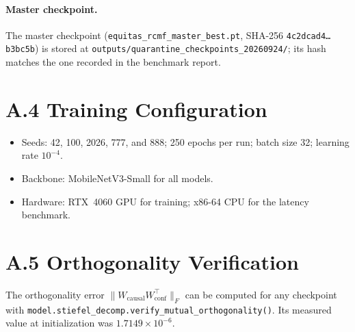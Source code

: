 \paragraph{Master checkpoint.} The master checkpoint (\texttt{equitas\_rcmf\_master\_best.pt}, SHA-256 \texttt{4c2dcad4\ldots b3bc5b}) is stored at \texttt{outputs/quarantine\_checkpoints\_20260924/}; its hash matches the one recorded in the benchmark report.

\section*{A.4 Training Configuration}
\begin{itemize}
    \item Seeds: 42, 100, 2026, 777, and 888; 250 epochs per run; batch size 32; learning rate $10^{-4}$.
    \item Backbone: MobileNetV3-Small for all models.
    \item Hardware: RTX~4060 GPU for training; x86-64 CPU for the latency benchmark.
\end{itemize}

\section*{A.5 Orthogonality Verification}
The orthogonality error $\|W_{\text{causal}} W_{\text{conf}}^{\top}\|_F$ can be computed for any checkpoint with \texttt{model.stiefel\_decomp.verify\_mutual\_orthogonality()}. Its measured value at initialization was $1.7149 \times 10^{-6}$.
